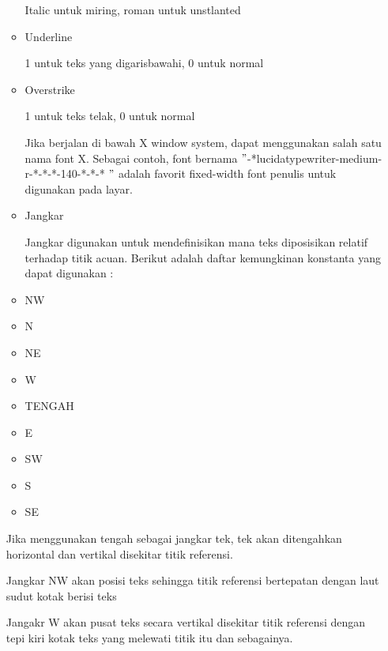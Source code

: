 \begin{itemize}
\begin{itemize}
Italic untuk miring, roman untuk unstlanted \par
\noindent 
\item Underline \par
1 untuk teks yang digarisbawahi, 0 untuk normal \par
\noindent 
\item Overstrike \par
1 untuk teks telak, 0 untuk normal \par
Jika berjalan di bawah X window system, dapat menggunakan salah satu nama font X. Sebagai contoh, font bernama  $ " $-*lucidatypewriter-medium-r-*-*-*-140-*-*-* $ " $ adalah favorit fixed-width font penulis untuk digunakan pada layar. \par
\noindent 
\item Jangkar \par
\noindent 
Jangkar digunakan untuk mendefinisikan mana teks diposisikan relatif terhadap titik acuan. Berikut adalah daftar kemungkinan konstanta yang dapat digunakan : \par
\noindent 
\item NW \par
\noindent 
\item N \par
\noindent 
\item NE \par
\noindent 
\item W \par
\noindent 
\item TENGAH \par
\noindent 
\item E \par
\noindent 
\item SW \par
\noindent 
\item S \par
\noindent 
\item SE\end{itemize}
 \par
\vspace{12pt}
Jika menggunakan tengah sebagai jangkar tek, tek akan ditengahkan horizontal dan vertikal disekitar titik referensi. \par
Jangkar NW akan posisi teks sehingga titik referensi bertepatan dengan laut sudut kotak berisi teks \par
Jangakr W akan pusat teks secara vertikal disekitar titik referensi dengan tepi kiri kotak teks yang melewati titik itu dan sebagainya. \par

\end{itemize}
